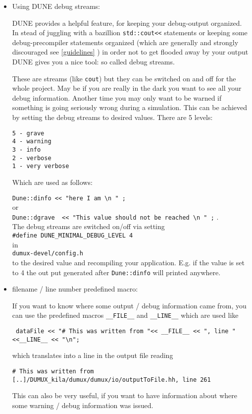 \begin{itemize}
\item Using DUNE debug streams:

  DUNE provides a helpful feature, for keeping your debug-output organized. 
  In stead of juggling with a bazillion \verb+std::cout<<+ statements or keeping some debug-precompiler statements organized (which are generally and strongly discouraged see \ref{guidelines} ) in order not to get 
  flooded away by your output DUNE gives you a nice tool: so called debug streams. 

  These are streams (like \verb+cout+) but they can be switched on and off for the whole project. 
  May be if you are really in the  dark you want to see all your debug information. Another time you may only want to be warned if something is going seriously wrong during a simulation. 
  This can be achieved by setting the debug streams to desired values. There are 5 levels:
\begin{verbatim}
5 - grave
4 - warning
3 - info
2 - verbose
1 - very verbose
\end{verbatim}
Which are used as follows:

\verb+Dune::dinfo << "here I am \n " ;+\\
or \\
\verb+Dune::dgrave  << "This value should not be reached \n " ;+ . \\
The debug streams are switched on/off via  setting  \\
\verb+#define DUNE_MINIMAL_DEBUG_LEVEL 4 + \\ 
in \\
\verb+dumux-devel/config.h+ \\
to the desired value and recompiling your application. E.g. if the value is set to 4 the out put generated after \verb+Dune::dinfo+ will printed anywhere. 

 \item filename / line number predefined macro:

If you want to  know where some output / debug information came from, you can use the predefined macros \verb+__FILE__+ and \verb+__LINE__+ 
which are used like            

\verb+ dataFile << "# This was written from "<< __FILE__ << ", line " <<__LINE__ << "\n";+

which translates into a line in the output file reading 

\verb+# This was written from [..]/DUMUX_kila/dumux/dumux/io/outputToFile.hh, line 261+

This can also be very useful, if you want to have information about where some warning / debug information was issued. 


\end{itemize}
